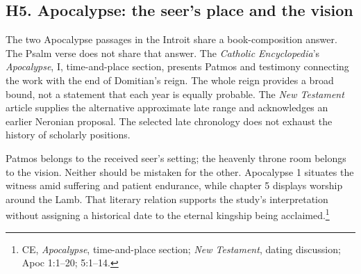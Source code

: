 \subsection{H5. Apocalypse: the seer's place and the vision}
\label{history-apocalypse}
The two Apocalypse passages in the Introit share a book-composition answer. The Psalm verse does not share that answer. The \emph{Catholic Encyclopedia}'s \emph{Apocalypse}, I, time-and-place section, presents Patmos and testimony connecting the work with the end of Domitian's reign. The whole reign provides a broad bound, not a statement that each year is equally probable. The \emph{New Testament} article supplies the alternative approximate late range and acknowledges an earlier Neronian proposal. The selected late chronology does not exhaust the history of scholarly positions.

Patmos belongs to the received seer's setting; the heavenly throne room belongs to the vision. Neither should be mistaken for the other. Apocalypse 1 situates the witness amid suffering and patient endurance, while chapter 5 displays worship around the Lamb. That literary relation supports the study's interpretation without assigning a historical date to the eternal kingship being acclaimed.\footnote{CE, \emph{Apocalypse}, time-and-place section; \emph{New Testament}, dating discussion; Apoc 1:1--20; 5:1--14.}

